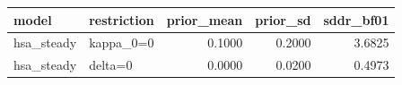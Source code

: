 \begin{tabular}{llrrr}
\toprule
model & restriction & prior\_mean & prior\_sd & sddr\_bf01 \\
\midrule
hsa\_steady & kappa\_0=0 & 0.1000 & 0.2000 & 3.6825 \\
hsa\_steady & delta=0 & 0.0000 & 0.0200 & 0.4973 \\
\bottomrule
\end{tabular}
